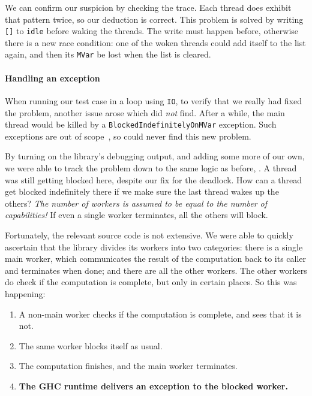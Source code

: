 We can confirm our suspicion by checking the trace.  Each thread does
exhibit that pattern twice, so our deduction is correct.  This problem
is solved by writing \verb|[]| to \verb|idle| before waking the
threads.  The write must happen before, otherwise there is a new race
condition: one of the woken threads could add itself to the list
again, and then its \verb|MVar| be lost when the list is cleared.

\paragraph{Handling an exception}
When running our test case in a loop using \verb|IO|, to verify that
we really had fixed the problem, another issue arose which \dejafu{}
did \emph{not} find.  After a while, the main thread would be killed
by a \verb|BlockedIndefinitelyOnMVar| exception.  Such exceptions are
out of scope~, so \dejafu{} could never find this
new problem.

By turning on the library's debugging output, and adding some more of
our own, we were able to track the problem down to the same logic as
before, .  A thread was still getting
blocked here, despite our fix for the deadlock.  How can a thread get
blocked indefinitely there if we make sure the last thread wakes up
the others?  \emph{The number of workers is assumed to be equal to the
  number of capabilities!}  If even a single worker terminates, all
the others will block.

Fortunately, the relevant source code is not extensive.  We were able
to quickly ascertain that the library divides its workers into two
categories: there is a single main worker, which communicates the
result of the computation back to its caller and terminates when done;
and there are all the other workers.  The other workers do check if
the computation is complete, but only in certain places.  So this was
happening:

\begin{enumerate}
\item A non-main worker checks if the computation is complete, and
  sees that it is not.
\item The same worker blocks itself as usual.
\item The computation finishes, and the main worker terminates.
\item \textbf{The GHC runtime delivers an exception to the blocked
    worker.}
\end{enumerate}

